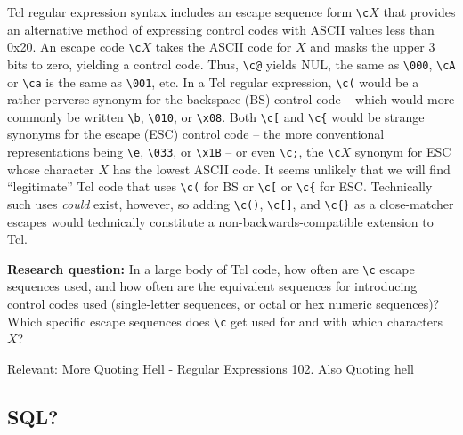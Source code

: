 Tcl regular expression syntax includes an escape sequence form
\verb|\c|$X$ that provides an alternative method of expressing control codes
with ASCII values less than 0x20.
An escape code \verb|\c|$X$ takes the ASCII code for $X$
and masks the upper 3 bits to zero, yielding a control code.
Thus, \verb|\c@| yields NUL, the same as \verb|\000|,
\verb|\cA| or \verb|\ca| is the same as \verb|\001|, etc.
In a Tcl regular expression,
\verb|\c(| would be a rather perverse synonym for
the backspace (BS) control code --
which would more commonly be written \verb|\b|, \verb|\010|, or \verb|\x08|.
Both \verb|\c[| and \verb|\c{|
would be strange synonyms for the escape (ESC) control code --
the more conventional representations
being \verb|\e|, \verb|\033|, or \verb|\x1B| --
or even \verb|\c;|, the \verb|\c|$X$ synonym for ESC
whose character $X$ has the lowest ASCII code.
It seems unlikely that we will find ``legitimate'' Tcl code 
that uses \verb|\c(| for BS or \verb|\c[| or \verb|\c{| for ESC.
Technically such uses \emph{could} exist, however,
so adding \verb|\c()|, \verb|\c[]|, and \verb|\c{}| as a close-matcher escapes
would technically constitute a non-backwards-compatible extension to Tcl.

\textbf{Research question:}
In a large body of Tcl code, how often are \verb|\c| escape sequences used,
and how often are the equivalent sequences for introducing control codes used
(\eg single-letter sequences, or octal or hex numeric sequences)?
Which specific escape sequences does \verb|\c| get used for
and with which characters $X$?

Relevant: \href{https://www.tcl.tk/man/tcl8.5/tutorial/Tcl21.html}{More Quoting Hell - Regular Expressions 102}.
Also \href{https://wiki.tcl-lang.org/page/Quoting+hell}{Quoting hell}

\subsection{SQL?}


